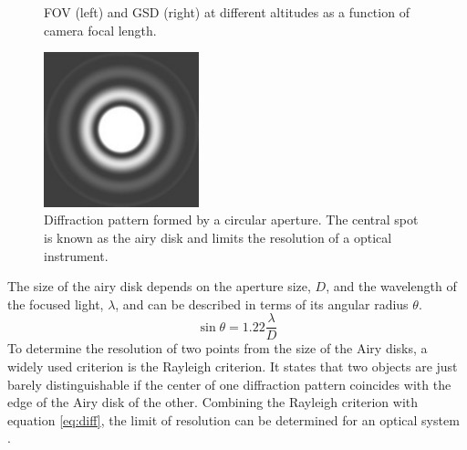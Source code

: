 \begin{figure}[htb]
\begin{center}
\caption{FOV (left) and GSD (right) at different altitudes as a function of  camera focal length.}
\label{cameramatlab}
\end{center}
\end{figure}

\begin{figure}[htb]
\begin{center}
\includegraphics[width=0.4\textwidth]{figures/navtheory/airy}
\caption{Diffraction pattern formed by a circular aperture. The central spot is known as the airy disk and limits the resolution of a optical instrument.}
\label{airy}
\end{center}
\end{figure}

\noindent
The size of the airy disk depends on the aperture size, $D$, and the wavelength of the focused light, $\lambda$, and can be described in terms of its angular radius $\theta$.
\begin{equation}
\label{eq:diff}
\sin \theta = 1.22 \dfrac{\lambda}{D}
\end{equation}
To determine the resolution of two points from the size of the Airy disks, a widely used criterion is the Rayleigh criterion. It states that two objects are just barely distinguishable if the center of one diffraction pattern coincides with the edge of the Airy disk of the other. Combining the Rayleigh criterion with equation \ref{eq:diff}, the limit of resolution can be determined for an optical system \cite{uniphys}.

